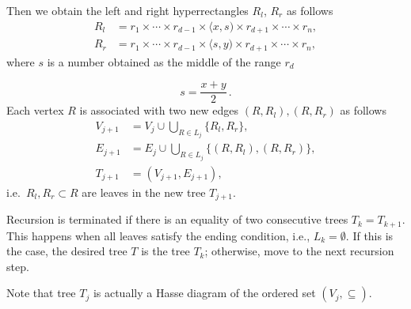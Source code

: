 Then we obtain the left and right hyperrectangles \(R_l\), \(R_r\) as
follows
\begin{align}
R_l &= r_1 \times  \cdots \times r_{d-1} \times  \langle x, s ) \times r_{d+1} \times \cdots \times r_n, \\
R_r &= r_1 \times  \cdots \times r_{d-1} \times \langle s, y ) \times r_{d+1} \times \cdots \times r_n,
\end{align}
where \(s\) is
a number obtained as the middle of the range \(r_d\,\)

\[s = \frac{x + y}{2}\,.\] Each vertex \(R\) is associated with two new
edges \((R,R_l ), (R, R_r)\) as follows
\begin{align*}
V_{j+1} &= V_j \cup \bigcup_{R \in L_j} \{R_l, R_r\},\\
E_{j+1} &= E_j \cup \bigcup_{R \in L_j} \{(R, R_l), (R,R_r)\},\\
T_{j+1} &= (V_{j+1}, E_{j+1}),
\end{align*}
i.e.~${R_l, R_r} \subset R$ are leaves in the new tree
\(T_{j+1}\).

Recursion is terminated if there is an equality of two consecutive trees \(T_k = T_{k+1}\). This happens when all leaves satisfy the ending condition, i.e., \(L_k = \emptyset\).
If this is the case, the desired tree $T$ is the tree $T_k$; otherwise, move to the next recursion step.


Note that tree \(T_{j}\) is actually a Hasse diagram of the ordered set
\((V_j,\subseteq)\).


